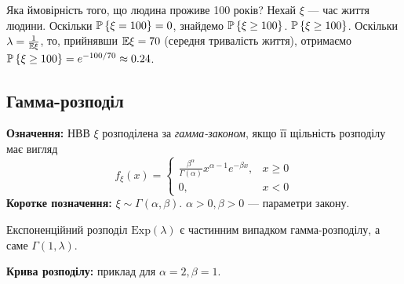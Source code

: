 \begin{example}
    Яка ймовірність того, що людина проживе 100 років? Нехай $\xi$ --- час життя людини.
    Оскільки $\P\left\{\xi = 100\right\} = 0$, знайдемо $\P\left\{ \xi \geq 100\right\}$.
    $\P\left\{ \xi \geq 100\right\}$.
    Оскільки $\lambda = \frac{1}{\E\xi}$, то, прийнявши $\E\xi = 70$ (середня тривалість життя),
    отримаємо $\P\left\{ \xi \geq 100\right\} = e^{-100/70} \approx 0.24$.
\end{example}

\subsection{Гамма-розподіл}
\noindent\textbf{Означення:}
    НВВ $\xi$ розподілена за \emph{гамма-законом}, 
    якщо її щільність розподілу має вигляд 
    \begin{equation}
        f_\xi(x) = \begin{cases}
            \frac{\beta^\alpha}{\Gamma(\alpha)} x^{\alpha-1} e^{-\beta x}, & x \geq 0 \\
            0, & x < 0
        \end{cases}
    \end{equation}
\textbf{Коротке позначення:} $\xi \sim {\Gamma}(\alpha, \beta)$.
    $\alpha >0, \beta > 0$ --- параметри закону.
\begin{remark}
    Експоненційний розподіл $\mathrm{Exp}(\lambda)$ є частинним випадком гамма-розподілу, а саме ${\Gamma}(1, \lambda)$.
\end{remark}
\begin{samepage}
    \noindent \textbf{Крива розподілу:} приклад для $\alpha = 2, \beta=1$.
    \begin{center}
    \end{center}
\end{samepage}

